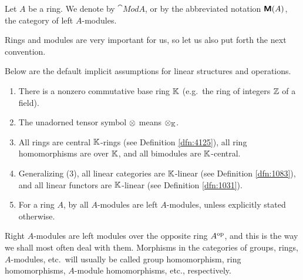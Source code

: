 \begin{dfn} \label{dfn:4126}
Let $A$ be a ring. 
We denote by $\cat{Mod} A$, or by the abbreviated notation $\boldsymbol{\mathsf{M}}(A)$, the 
category of left $A$-modules.
\end{dfn}

Rings and modules are very important for us, so let us also put forth the next 
convention.

\begin{conv} \label{conv:2490} %
Below are the default implicit assumptions for linear structures and 
operations. 
\begin{enumerate}
\item There is a nonzero commutative base ring $\mathbb{K}$ (e.g.\ the ring of integers 
$\mathbb{Z}$ of a field). 

\item The unadorned tensor symbol $\otimes$ means $\otimes_{\mathbb{K}}$. 

\item All rings are central $\mathbb{K}$-rings (see Definition 
\ref{dfn:4125}), all ring homomorphisms are over $\mathbb{K}$, and all bimodules are 
$\mathbb{K}$-central. 

\item Generalizing (3), all linear categories are $\mathbb{K}$-linear (see 
Definition \ref{dfn:1083}), and all linear functors are $\mathbb{K}$-linear (see 
Definition \ref{dfn:1031}).

\item For a ring $A$, by all $A$-modules are left $A$-modules, unless 
explicitly stated otherwise. 
\end{enumerate}
\end{conv}

Right $A$-modules are left modules over the opposite ring $A^{\mathrm{op}}$, and 
this is the way we shall most often deal with them. 
Morphisms in the categories of groups, rings, $A$-modules, etc.\ will 
usually be called group homomorphism, ring homomorphisms, $A$-module 
homomorphisms, etc., respectively. 

